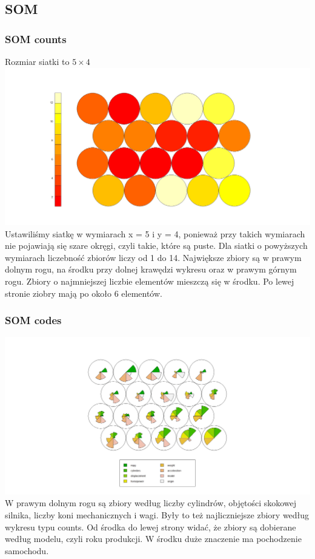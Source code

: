 \documentclass{article}
\begin{document}
    \subsection{SOM}
        \subsubsection{SOM counts}    
            Rozmiar siatki to $5\times4$
            \newline
            \includegraphics[width = \textwidth]{som_counts_fig.jpeg}
            Ustawiliśmy siatkę w wymiarach x = 5 i y = 4, ponieważ przy takich wymiarach nie pojawiają się szare okręgi, czyli takie, które są puste. Dla siatki o powyższych wymiarach liczebność zbiorów liczy od 1 do 14. Największe zbiory są w prawym dolnym rogu, na środku przy dolnej krawędzi wykresu oraz w prawym górnym rogu. Zbiory o najmniejszej liczbie elementów mieszczą się w środku. Po lewej stronie ziobry mają po około 6 elementów.

        \subsubsection{SOM codes}   
            \includegraphics[width = \textwidth]{som_codes_fig.jpeg}
            W prawym dolnym rogu są zbiory według liczby cylindrów, objętości skokowej silnika, liczby koni mechanicznych i wagi. Były to też najliczniejsze zbiory według wykresu typu counts. Od środka do lewej strony widać, że zbiory są dobierane według modelu, czyli roku produkcji. W środku duże znaczenie ma pochodzenie samochodu.
\end{document}

